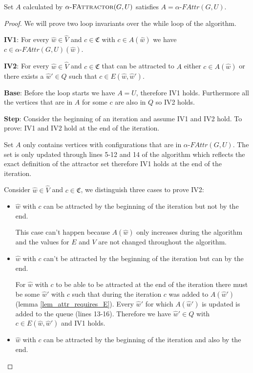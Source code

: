 \begin{theorem}
Set $A$ calculated by $\textsc{$\alpha$-FAttractor}(G,U)$ satisfies $A = \alpha\textit{-FAttr}(G,U)$.
	\begin{proof} We will prove two loop invariants over the while loop of the algorithm.
		
		\textbf{IV1}: For every $\hat{w} \in \hat{V}$ and $c \in \mathfrak{C}$ with $c \in A(\hat{w})$ we have $c \in \alpha\textit{-FAttr}(G,U)(\hat{w})$.
		
		\textbf{IV2}: For every $\hat{w} \in \hat{V}$ and $c \in \mathfrak{C}$ that can be attracted to $A$ either $c \in A(\hat{w})$ or there exists a $\hat{w}' \in Q$ such that $c \in E(\hat{w},\hat{w}')$.
		
		\textbf{Base}: Before the loop starts we have $A = U$, therefore IV1 holds. Furthermore all the vertices that are in $A$ for some $c$ are also in $Q$ so IV2 holds.
		
		\textbf{Step}: Consider the beginning of an iteration and assume IV1 and IV2 hold. To prove: IV1 and IV2 hold at the end of the iteration.
		
		Set $A$ only contains vertices with configurations that are in $\alpha\textit{-FAttr}(G,U)$. The set is only updated through lines 5-12 and 14 of the algorithm which reflects the exact definition of the attractor set therefore IV1 holds at the end of the iteration.
		
		Consider $\hat{w} \in \hat{V}$ and $c \in \mathfrak{C}$, we distinguish three cases to prove IV2:
		\begin{itemize}
			\item $\hat{w}$ with $c$ can be attracted by the beginning of the iteration but not by the end.
			
			This case can't happen because $A(\hat{w})$ only increases during the algorithm and the values for $E$ and $V$ are not changed throughout the algorithm.
			\item $\hat{w}$ with $c$ can't be attracted by the beginning of the iteration but can by the end.
			
			For $\hat{w}$ with $c$ to be able to be attracted at the end of the iteration there must be some $\hat{w}'$ with $c$ such that during the iteration $c$ was added to $A(\hat{w}')$ (lemma \ref{lem_attr_requires_E}). Every $\hat{w}'$ for which $A(\hat{w}')$ is updated is added to the queue (lines 13-16). Therefore we have $\hat{w}' \in Q$ with $c \in E(\hat{w},\hat{w}')$ and IV1 holds.
			\item $\hat{w}$ with $c$ can be attracted by the beginning of the iteration and also by the end.
			

\end{itemize}
\end{proof}
\end{theorem}
